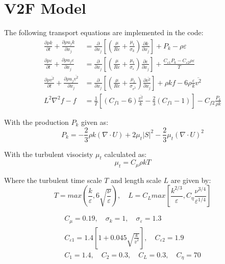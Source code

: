 \documentclass[paper=a4, fontsize=12pt]{scrartcl} %
\newcommand{\pd}{\partial }
\begin{document}
\section{V2F Model}
The following transport equations are implemented in the code:
\begin{equation} \label{eq:ktDeng}
\begin{split}
\frac{\pd \rho k}{\pd t} + \frac{\pd \rho u_j k}{\pd x_j}                     &= \frac{\pd}{\pd x_j}\left[\left(\frac{\mu}{Re} + \frac{\mu_t}{\sigma_k}\right)\frac{\pd k}{\pd x_j}\right] + P_{k}- \rho\varepsilon \\
\frac{\pd \rho \varepsilon}{\pd t} + \frac{\pd \rho u_j \varepsilon}{\pd x_j} &= \frac{\pd}{\pd x_j}\left[ \left(\frac{\mu}{Re} + \frac{\mu_t}{\sigma_{\varepsilon}}\right)\frac{\pd \varepsilon}{\pd x_j}\right] + \frac{C_{\varepsilon1}P_k  -C_{\varepsilon2} \rho \varepsilon}{T}   \\
\frac{\pd \rho \overline{v^2}}{\pd t} + \frac{\pd \rho u_j \overline{v^2}}{\pd x_j}           &= \frac{\pd}{\pd x_j}\left[ \left(\frac{\mu}{Re} + \frac{\mu_t}{\sigma_{\overline{v^2}}}\right)\frac{\pd \overline{v^2}}{\pd x_j}\right] + \rho k f - 6\rho \frac{\varepsilon}{k}\overline{v^2} \\
L^2\nabla^2 f -f &= \frac{1}{T}\left[(C_{f1}-6)\frac{\overline{v^2}}{k}-\frac{2}{3}(C_{f1}-1)\right]-C_{f2}\frac{P_k}{\rho k}
\end{split}
\end{equation}

With the production $P_k$ given as:
\begin{equation}
P_k = -\frac{2}{3}\rho k (\nabla \cdot U)+ 2\mu_t|S|^2 - \frac{2}{3}\mu_t\left(\nabla \cdot U\right)^2
\end{equation}

With the turbulent visocisty $\mu_t$ calculated as:
\begin{equation}
\mu_t = C_\mu \rho k T
\end{equation}

Where the turbulent time scale $T$ and length scale $L$ are given by:
\begin{equation}
T = max\left(\frac{k}{\varepsilon},6\sqrt{\frac{\nu}{\varepsilon}}\right), \quad L = C_L max\left[\frac{k^{2/3}}{\varepsilon},C_\eta\frac{\nu^{3/4}}{\varepsilon^{1/4}}\right]
\end{equation}

\begin{equation}
\begin{split}
C_\mu = 0.19,\quad  \sigma_k = 1, \quad \sigma_\varepsilon =1.3 \\
C_{\varepsilon1} = 1.4\left[1+0.045\sqrt{\frac{k}{\overline{v}^2}}\right], \quad C_{\varepsilon2} = 1.9 \\
C_1 = 1.4, \quad C_2 = 0.3, \quad C_L=0.3, \quad C_\eta = 70
\end{split}
\end{equation}
\end{document}
